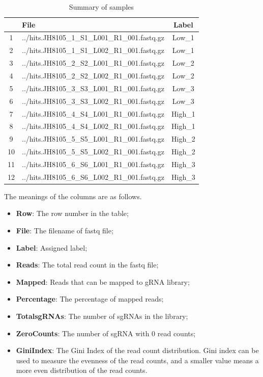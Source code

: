 \documentclass{article}
\begin{document}
\begin{table}[ht]
\centering
\begin{tabular}{cp{9cm}c}
  \hline
 & File & Label \\ 
  \hline
1 & ../hits.JH8105\_1\_S1\_L001\_R1\_001.fastq.gz & Low\_1 \\ 
  2 & ../hits.JH8105\_1\_S1\_L002\_R1\_001.fastq.gz & Low\_1 \\ 
  3 & ../hits.JH8105\_2\_S2\_L001\_R1\_001.fastq.gz & Low\_2 \\ 
  4 & ../hits.JH8105\_2\_S2\_L002\_R1\_001.fastq.gz & Low\_2 \\ 
  5 & ../hits.JH8105\_3\_S3\_L001\_R1\_001.fastq.gz & Low\_3 \\ 
  6 & ../hits.JH8105\_3\_S3\_L002\_R1\_001.fastq.gz & Low\_3 \\ 
  7 & ../hits.JH8105\_4\_S4\_L001\_R1\_001.fastq.gz & High\_1 \\ 
  8 & ../hits.JH8105\_4\_S4\_L002\_R1\_001.fastq.gz & High\_1 \\ 
  9 & ../hits.JH8105\_5\_S5\_L001\_R1\_001.fastq.gz & High\_2 \\ 
  10 & ../hits.JH8105\_5\_S5\_L002\_R1\_001.fastq.gz & High\_2 \\ 
  11 & ../hits.JH8105\_6\_S6\_L001\_R1\_001.fastq.gz & High\_3 \\ 
  12 & ../hits.JH8105\_6\_S6\_L002\_R1\_001.fastq.gz & High\_3 \\ 
   \hline
\end{tabular}
\caption{Summary of samples} 
\label{tab:three}
\end{table}



The meanings of the columns are as follows.

\begin{itemize}
\item \textbf{Row}: The row number in the table;
\item \textbf{File}: The filename of fastq file;
\item \textbf{Label}: Assigned label;
\item \textbf{Reads}: The total read count in the fastq file;
\item \textbf{Mapped}: Reads that can be mapped to gRNA library;
\item \textbf{Percentage}: The percentage of mapped reads;
\item \textbf{TotalsgRNAs}: The number of sgRNAs in the library; 
\item \textbf{ZeroCounts}: The number of sgRNA with 0 read counts;
\item \textbf{GiniIndex}: The Gini Index of the read count distribution. Gini index can be used to measure the evenness of the read counts, and a smaller value means a more even distribution of the read counts.
\end{itemize}
\end{document}
